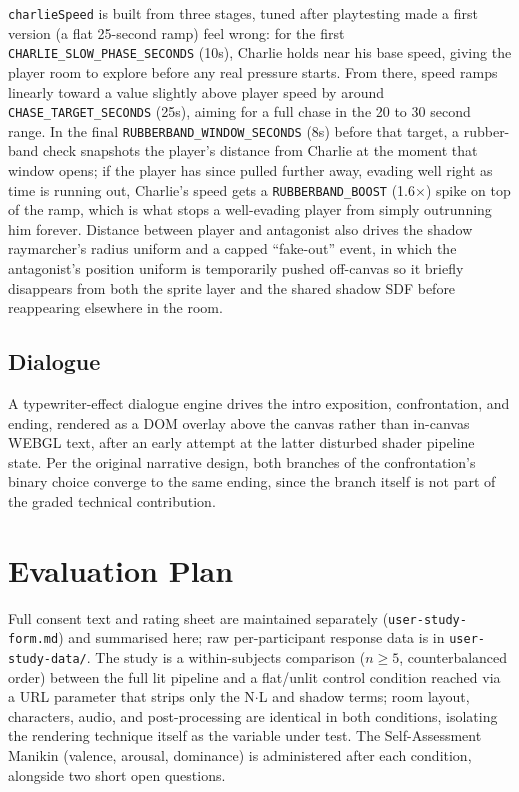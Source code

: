 \documentclass[conference]{IEEEtran}
\begin{document}
\texttt{charlieSpeed} is built from three stages, tuned after playtesting made a first version (a flat 25-second ramp) feel wrong: for the first \texttt{CHARLIE\_SLOW\_PHASE\_SECONDS} (10s), Charlie holds near his base speed, giving the player room to explore before any real pressure starts. From there, speed ramps linearly toward a value slightly above player speed by around \texttt{CHASE\_TARGET\_SECONDS} (25s), aiming for a full chase in the 20 to 30 second range. In the final \texttt{RUBBERBAND\_WINDOW\_SECONDS} (8s) before that target, a rubber-band check snapshots the player's distance from Charlie at the moment that window opens; if the player has since pulled further away, evading well right as time is running out, Charlie's speed gets a \texttt{RUBBERBAND\_BOOST} (1.6$\times$) spike on top of the ramp, which is what stops a well-evading player from simply outrunning him forever. Distance between player and antagonist also drives the shadow raymarcher's radius uniform and a capped ``fake-out'' event, in which the antagonist's position uniform is temporarily pushed off-canvas so it briefly disappears from both the sprite layer and the shared shadow SDF before reappearing elsewhere in the room.

\subsection{Dialogue}
A typewriter-effect dialogue engine drives the intro exposition, confrontation, and ending, rendered as a DOM overlay above the canvas rather than in-canvas WEBGL text, after an early attempt at the latter disturbed shader pipeline state. Per the original narrative design, both branches of the confrontation's binary choice converge to the same ending, since the branch itself is not part of the graded technical contribution.

\section{Evaluation Plan}
\label{sec:evaluation}
Full consent text and rating sheet are maintained separately (\texttt{user-study-form.md}) and summarised here; raw per-participant response data is in \texttt{user-study-data/}. The study is a within-subjects comparison ($n \geq 5$, counterbalanced order) between the full lit pipeline and a flat/unlit control condition reached via a URL parameter that strips only the N$\cdot$L and shadow terms; room layout, characters, audio, and post-processing are identical in both conditions, isolating the rendering technique itself as the variable under test. The Self-Assessment Manikin (valence, arousal, dominance) \cite{bradleylang1994sam} is administered after each condition, alongside two short open questions.
\end{document}
